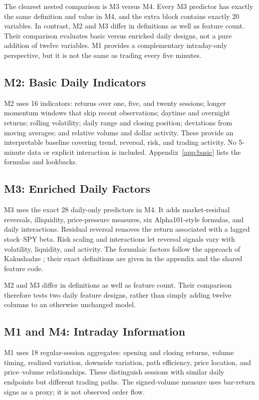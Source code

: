 \documentclass[11pt,a4paper]{article}
\begin{document}
The clearest nested comparison is M3 versus M4. Every M3 predictor has exactly
the same definition and value in M4, and the extra block contains exactly
20 variables. In contrast, M2 and M3 differ in definitions as well as feature
count. Their comparison evaluates basic versus enriched daily designs, not a
pure addition of twelve variables. M1 provides a complementary intraday-only
perspective, but it is not the same as trading every five minutes.

\subsection{M2: Basic Daily Indicators}
M2 uses 16 indicators: returns over one, five, and twenty sessions;
longer momentum windows that skip recent observations; daytime and overnight
returns; rolling volatility; daily range and closing position; deviations
from moving averages; and relative volume and dollar activity. These provide
an interpretable baseline covering trend, reversal, risk, and trading activity.
No 5-minute data or explicit interaction is included.
Appendix~\ref{app:basic} lists the formulas and lookbacks.

\subsection{M3: Enriched Daily Factors}
M3 uses the exact 28 daily-only predictors in M4. It adds market-residual
reversals, illiquidity, price-pressure measures, six Alpha101-style formulas,
and daily interactions. Residual reversal removes the return associated with
a lagged stock--SPY beta. Risk scaling and interactions let reversal signals
vary with volatility, liquidity, and activity. The formulaic factors follow
the approach of Kakushadze \cite{alpha101}; their exact definitions are given
in the appendix and the shared feature code.

M2 and M3 differ in definitions as well as feature count. Their comparison
therefore tests two daily feature designs, rather than simply adding twelve
columns to an otherwise unchanged model.

\subsection{M1 and M4: Intraday Information}
M1 uses 18 regular-session aggregates: opening and closing returns, volume
timing, realized variation, downside variation, path efficiency, price
location, and price--volume relationships. These distinguish sessions with
similar daily endpoints but different trading paths. The signed-volume
measure uses bar-return signs as a proxy; it is not observed order flow.
\end{document}

